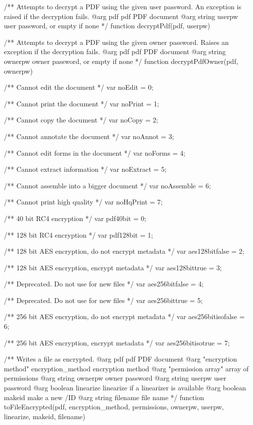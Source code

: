 /** Attempts to decrypt a PDF using the given user password. An exception is
raised if the decryption fails.
@arg {pdf} pdf PDF document
@arg {string} userpw user password, or empty if none */
function decryptPdf(pdf, userpw) {}

/** Attempts to decrypt a PDF using the given owner password. Raises an
exception if the decryption fails.
@arg {pdf} pdf PDF document
@arg {string} ownerpw owner password, or empty if none */
function decryptPdfOwner(pdf, ownerpw) {}

/** Cannot edit the document */
var noEdit = 0;

/** Cannot print the document */
var noPrint = 1;

/** Cannot copy the document */
var noCopy = 2;

/** Cannot annotate the document */
var noAnnot = 3;

/** Cannot edit forms in the document */
var noForms = 4;

/** Cannot extract information */
var noExtract = 5;

/** Cannot assemble into a bigger document */
var noAssemble = 6;

/** Cannot print high quality */
var noHqPrint = 7;

/** 40 bit RC4 encryption */
var pdf40bit = 0;

/** 128 bit RC4 encryption */
var pdf128bit = 1;

/** 128 bit AES encryption, do not encrypt metadata */
var aes128bitfalse = 2;

/** 128 bit AES encryption, encrypt metadata */
var aes128bittrue = 3;

/** Deprecated. Do not use for new files */
var aes256bitfalse = 4;

/** Deprecated. Do not use for new files */
var aes256bittrue = 5;

/** 256 bit AES encryption, do not encrypt metadata */
var aes256bitisofalse = 6;

/** 256 bit AES encryption, encrypt metadata */
var aes256bitisotrue = 7;

/** Writes a file as encrypted.
@arg {pdf} pdf PDF document
@arg {"encryption method"} encryption_method encryption method
@arg {"permission array"} array of permissions
@arg {string} ownerpw owner password
@arg {string} userpw user password
@arg {boolean} linearize linearize if a linearizer is available
@arg {boolean} makeid make a new /ID
@arg {string} filename file name */
function toFileEncrypted(pdf, encryption_method, permissions, ownerpw, userpw, linearize, makeid, filename) {}

